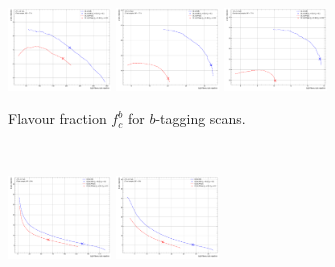 \begin{figure}[h!]
  \centering
  \begin{subfigure}[b]{0.98\textwidth}
      \centering
      \includegraphics[width=0.3\textwidth]{Images/FTAG/VRDL1d/scansfraction/thesis_plot_frac/contour_fraction_ttbar_200.pdf}
      \includegraphics[width=0.3\textwidth]{Images/FTAG/VRDL1d/scansfraction/thesis_plot_frac/contour_fraction_zpext_200.pdf}
      \includegraphics[width=0.3\textwidth]{Images/FTAG/VRDL1d/scansfraction/thesis_plot_frac/contour_fraction_graviton_200.pdf}
      \caption{Flavour fraction $f_c^b$ for $b$-tagging scans.} 
      \label{fig:DL1dVRscanfb}
  \end{subfigure}\\
  \begin{subfigure}[b]{0.98\textwidth}
    \centering %
    \includegraphics[width=0.3\textwidth]{Images/FTAG/VRDL1d/scansfraction/thesis_plot_frac_c/contour_fraction_ttbar_2000.pdf}
    \includegraphics[width=0.3\textwidth]{Images/FTAG/VRDL1d/scansfraction/thesis_plot_frac_c/contour_fraction_zpext_2000.pdf}

\end{subfigure}
\end{figure}
